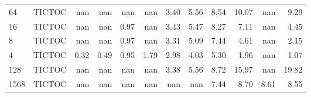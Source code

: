 \begin{tabular}{llrrrrrrrrrr}
64   & TICTOC &  nan &  nan &  nan &  nan & 3.40 & 5.56 &  8.54 & 10.07 &   nan &  9.29 \\
16   & TICTOC &  nan &  nan & 0.97 &  nan & 3.43 & 5.47 &  8.27 &  7.11 &   nan &  4.45 \\
8    & TICTOC &  nan &  nan & 0.97 &  nan & 3.31 & 5.09 &  7.44 &  4.61 &   nan &  2.15 \\
4    & TICTOC & 0.32 & 0.49 & 0.95 & 1.79 & 2.98 & 4.03 &  5.30 &  1.96 &   nan &  1.07 \\
128  & TICTOC &  nan &  nan &  nan &  nan & 3.38 & 5.56 &  8.72 & 15.97 &   nan & 19.82 \\
1568 & TICTOC &  nan &  nan &  nan &  nan &  nan &  nan &  7.44 &  8.70 &  8.61 &  8.55 \\
\bottomrule
\end{tabular}
